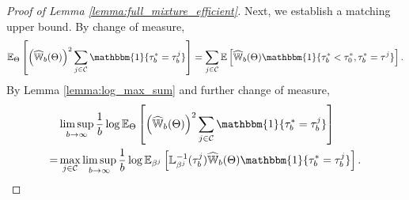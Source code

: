 \documentclass[aap,preprint]{imsart}
\newcommand{\Exp}{{\mathbb{E}}}
\theoremstyle{plain}
\theoremstyle{definition}
\begin{document}
\begin{appendix}
\begin{proof}[Proof of Lemma \ref{lemma:full_mixture_efficient}]
Next, we establish a matching upper bound. By change of measure,
\begin{align*}
\Exp_{\Theta}\left[ \left(\widehat{\mathbb{W}}_{b}(\Theta)\right)^2 \sum_{j \in \mathcal{C}} \mathbbm{1}\{\tau_b^* = \tau_b^j\}\right] = \sum_{j \in \mathcal{C}}\Exp\left[\widehat{\mathbb{W}}_{b}(\Theta)\mathbbm{1}\{\tau_b^* < \tau_0^*, \tau_b^* = \tau^j\} \right].
\end{align*}
By Lemma \ref{lemma:log_max_sum} and further change of measure,
\begin{align*}
   & \limsup_{b\to \infty} \frac{1}{b} \log       \Exp_{\Theta}\left[ \left(\widehat{\mathbb{W}}_{b}(\Theta)\right)^2 \sum_{j \in \mathcal{C}} \mathbbm{1}\{\tau_b^* = \tau_b^j\}\right]  \\
   =& \max_{j \in \mathcal{C}} \limsup_{b\to \infty} \frac{1}{b} \log       \Exp_{\beta^j}\left[ \mathbb{L}_{\beta^j}^{-1}(\tau_b^j)\widehat{\mathbb{W}}_{b}(\Theta)  \mathbbm{1}\{\tau_b^* = \tau_b^j\}\right].
\end{align*}


\end{proof}
\end{appendix}
\end{document}
